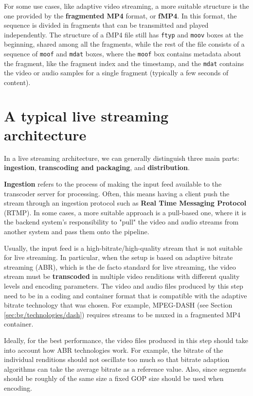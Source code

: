 
For some use cases, like adaptive video streaming, a more suitable structure is the one provided by the \textbf{fragmented MP4} format, or \textbf{fMP4}. In this format, the sequence is divided in fragments that can be transmitted and played independently. The structure of a fMP4 file still has \texttt{ftyp} and \texttt{moov} boxes at the beginning, shared among all the fragments, while the rest of the file consists of a sequence of \texttt{moof} and \texttt{mdat} boxes, where the \texttt{moof} box contains metadata about the fragment, like the fragment index and the timestamp, and the \texttt{mdat} contains the video or audio samples for a single fragment (typically a few seconds of content).


\section{A typical live streaming architecture}
\label{sec:bg/compression}

In a live streaming architecture, we can generally distinguish three main parts: \textbf{ingestion}, \textbf{transcoding and packaging}, and \textbf{distribution}.

\textbf{Ingestion} refers to the process of making the input feed available to the transcoder server for processing. Often, this means having a client push the stream through an ingestion protocol such as \textbf{Real Time Messaging Protocol} (RTMP). In some cases, a more suitable approach is a pull-based one, where it is the backend system's responsibility to "pull" the video and audio streams from another system and pass them onto the pipeline.

Usually, the input feed is a high-bitrate/high-quality stream that is not suitable for live streaming. In particular, when the setup is based on adaptive bitrate streaming (ABR), which is the de facto standard for live streaming, the video stream must be \textbf{transcoded} in multiple video renditions with different quality levels and encoding parameters. The video and audio files produced by this step need to be in a coding and container format that is compatible with the adaptive bitrate technology that was chosen. For example, MPEG-DASH (see Section \ref{sec:bg/technologies/dash}) requires streams to be muxed in a fragmented MP4 container.

Ideally, for the best performance, the video files produced in this step should take into account how ABR technologies work. For example, the bitrate of the individual renditions should not oscillate too much so that bitrate adaption algorithms can take the average bitrate as a reference value. Also, since segments should be roughly of the same size a fixed GOP size should be used when encoding.\cite{ozer}


